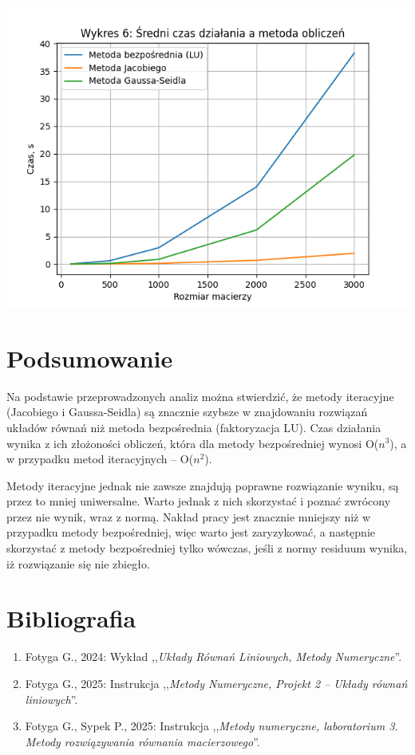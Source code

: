 \documentclass{article}
\begin{document}
\includegraphics[scale=0.67]{chart6.png}

\section{Podsumowanie}

Na podstawie przeprowadzonych analiz można stwierdzić, że metody iteracyjne (Jacobiego i Gaussa-Seidla) są znacznie szybsze w znajdowaniu rozwiązań układów równań niż metoda bezpośrednia (faktoryzacja LU). Czas działania wynika z ich złożoności obliczeń, która dla metody bezpośredniej wynosi O($n^3$), a w przypadku metod iteracyjnych -- O($n^2$).

Metody iteracyjne jednak nie zawsze znajdują poprawne rozwiązanie wyniku, są przez to mniej uniwersalne. Warto jednak z nich skorzystać i poznać zwrócony przez nie wynik, wraz z normą. Nakład pracy jest znacznie mniejszy niż w przypadku metody bezpośredniej, więc warto jest zaryzykować, a następnie skorzystać z metody bezpośredniej tylko wówczas, jeśli z normy residuum wynika, iż rozwiązanie się nie zbiegło.



\section{Bibliografia}
\begin{enumerate}
\item Fotyga G., 2024: Wykład ,,\textit{Układy Równań Liniowych, Metody Numeryczne}''.
\item Fotyga G., 2025: Instrukcja ,,\textit{Metody Numeryczne, Projekt 2 -- Układy równań liniowych}''.
\item Fotyga G., Sypek P., 2025: Instrukcja ,,\textit{Metody numeryczne, laboratorium 3.
Metody rozwiązywania równania macierzowego}''.

\end{enumerate}
\end{document}
